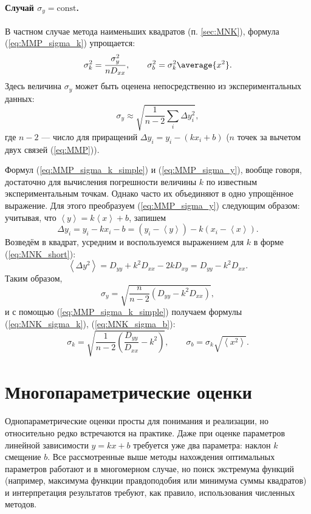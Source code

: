 \paragraph{Случай $\sigma_{y}=\mathrm{const}$.}
В частном случае метода наименьших квадратов (п. \ref{sec:MNK}),
формула (\ref{eq:MMP_sigma_k}) упрощается:
\begin{equation}
\sigma_{k}^{2}=\frac{\sigma_{y}^{2}}{nD_{xx}},\qquad\sigma_{b}^{2}=\sigma_{k}^{2}
\average{x^{2}}.\label{eq:MMP_sigma_k_simple}
\end{equation}
Здесь величина $\sigma_{y}$ может быть оценена непосредственно из
экспериментальных данных:
\begin{equation}
\sigma_{y}\approx\sqrt{\frac{1}{n-2}\sum_{i}\Delta y_{i}^{2}},\label{eq:MMP_sigma_y}
\end{equation}
где $n-2$ --- число 
для приращений $\Delta y_{i} = y_i - (kx_i+b)$ ($n$ точек за вычетом двух связей
(\ref{eq:MMP})).

Формул (\ref{eq:MMP_sigma_k_simple}) и (\ref{eq:MMP_sigma_y}),
вообще говоря, достаточно для вычисления погрешности величины $k$
по известным экспериментальным точкам. Однако часто их объединяют
в одно упрощённое выражение. Для этого преобразуем (\ref{eq:MMP_sigma_y})
следующим образом: учитывая, что $\left\langle y\right\rangle =k\left\langle x\right\rangle +b$,
запишем
\[
\Delta y_{i}=y_{i}-kx_{i}-b=\left(y_{i}-\left\langle y\right\rangle \right)-k\left(x_{i}-\left\langle x\right\rangle \right).
\]
Возведём в квадрат, усредним и воспользуемся выражением для $k$ в
форме (\ref{eq:MNK_short}):
\[
\left\langle \Delta y^{2}\right\rangle =D_{yy}+k^{2}D_{xx}-2kD_{xy}=D_{yy}-k^{2}D_{xx}.
\]
Таким образом,
\[
\sigma_{y}=\sqrt{\frac{n}{n-2}\left(D_{yy}-k^{2}D_{xx}\right)},
\]
и с помощью (\ref{eq:MMP_sigma_k_simple}) получаем формулы (\ref{eq:MNK_sigma_k}),
(\ref{eq:MNK_sigma_b}):
\[
\boxed{\sigma_{k}=\sqrt{\frac{1}{n-2}\left(\frac{D_{yy}}{D_{xx}}-k^{2}\right)},\qquad\sigma_{b}=\sigma_{k}\sqrt{\left\langle x^{2}\right\rangle }}.
\]

\section{Многопараметрические оценки}
\label{sec:multiparam}

Однопараметрические оценки просты для понимания и реализации, но относительно
редко встречаются на практике. Даже при оценке параметров линейной зависимости
$y = k x + b$ требуется уже два параметра: наклон $k$ смещение $b$.
Все рассмотренные выше методы нахождения оптимальных параметров работают и
в многомерном случае, но поиск экстремума функций
(например, максимума функции правдоподобия или минимума суммы квадратов)
и интерпретация результатов требуют, как правило, использования численных методов.

